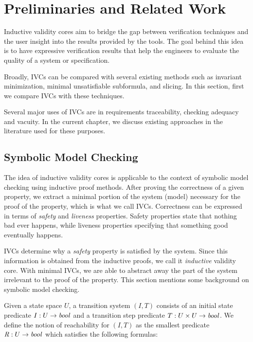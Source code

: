 \chapter{Preliminaries and Related Work}

\label{sec:related}
Inductive validity cores aim to bridge the gap between verification techniques and the user insight into the results provided by the tools. The goal behind this idea is to have expressive verification results that help the engineers to evaluate the quality of a system or specification.

Broadly, IVCs can be compared with several existing methods such as invariant minimization, minimal unsatisfiable subformula, and slicing. In this section, first we compare IVCs with these techniques.

Several major uses of IVCs are in requirements traceability, checking adequacy and vacuity. In the current chapter, we discuss existing approaches in the literature used for these purposes.




\section{Symbolic Model Checking}
\label{ch:background}
The idea of inductive validity cores is applicable to the context of symbolic model checking using inductive proof methods. After proving the correctness of a given property, we extract a minimal portion of the system (model) necessary for the proof of the property, which is what we call IVCs.
Correctness can be expressed in terms of \emph{safety} and \emph{liveness} properties. Safety properties state that nothing bad ever happens, while liveness properties specifying that something good eventually happens. 

IVCs determine why a \emph{safety} property is satisfied by the system. Since this information is obtained from the inductive proofs, we call it \emph{inductive} validity core. With minimal IVCs, we are able to abstract away the part of the system irrelevant to the proof of the property. This section mentions some background on symbolic model checking.

Given a state space $U$, a transition system $(I,T)$ consists of an
initial state predicate $ I : U \to \mathit{bool} $ and a transition step
predicate $ T : U \times U \to \mathit{bool} $.
We define the notion of
reachability for $(I, T)$ as the smallest predicate $\mathit{R} : U \to
\mathit{bool}$ which satisfies the following formulas:

